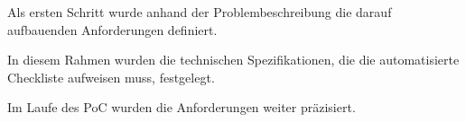 Als ersten Schritt wurde anhand der Problembeschreibung die darauf aufbauenden Anforderungen definiert. 

In diesem Rahmen wurden die technischen Spezifikationen, die die automatisierte Checkliste aufweisen muss, festgelegt. 

Im Laufe des PoC wurden die Anforderungen weiter präzisiert.